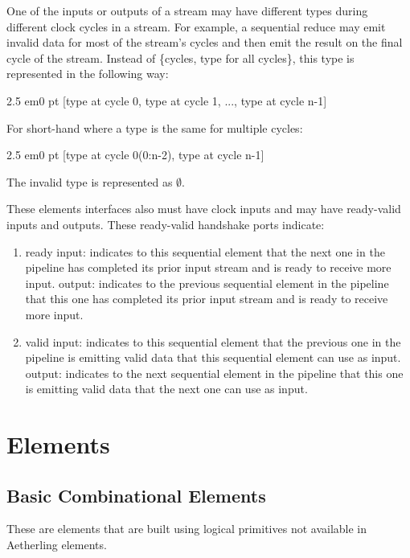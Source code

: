 \documentclass[11pt,fleqn]{article}
\numberwithin{equation}{subsection}
\begin{document}
One of the inputs or outputs of a stream may have different types during different
clock cycles in a stream. For example, a sequential reduce may emit invalid 
data for most of the stream's cycles and then emit the result on the final
cycle of the stream. Instead of \{cycles, type for all cycles\}, 
this type is represented in the following way:
\begin{adjustwidth}{2.5 em}{0 pt}
    [type at cycle 0, type at cycle 1, ..., type at cycle n-1]
\end{adjustwidth}
For short-hand where a type is the same for multiple cycles:
\begin{adjustwidth}{2.5 em}{0 pt}
    [type at cycle 0(0:n-2), type at cycle n-1]
\end{adjustwidth}
The invalid type is represented as $\emptyset$.

These elements interfaces also must have clock inputs and may have ready-valid 
inputs and outputs. These ready-valid handshake ports indicate:
\begin{enumerate}
        \item ready
            \subitem input: indicates to this sequential element that the next 
            one in the pipeline has completed its prior input stream and is 
            ready to receive more input.
            \subitem output: indicates to the previous sequential element in the 
            pipeline that this one has completed its prior input stream and is
            ready to receive more input.
        \item valid
            \subitem input: indicates to this sequential element that the previous
            one in the pipeline is emitting valid data that this sequential 
            element can use as input.
            \subitem output: indicates to the next sequential element in the
            pipeline that this one is emitting valid data that the next one
            can use as input.
\end{enumerate}

\section{Elements}

\subsection{Basic Combinational Elements}
These are elements that are built using logical primitives not available in
Aetherling elements.
\end{document}
